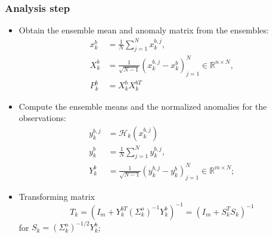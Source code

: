 \documentclass{article}
\begin{document}
\subsubsection{Analysis step}
\begin{itemize}
	\item Obtain the ensemble mean and anomaly matrix from the ensembles:
	      \begin{align*}
		      x_k^b & = \frac1N\sum_{j=1}^Nx_k^{b,j},                                           \\
		      X_k^b & = \frac1{\sqrt{N-1}}(x_k^{b,j} - x_k^b)_{j=1}^N\in\mathbb{R}^{n\times N}, \\
		      P_k^b & = X_k^bX_k^{bT}
	      \end{align*}
	\item Compute the ensemble means and the normalized anomalies for the observations:
	      \begin{align*}
		      y_k^{b,j} & = \mathcal{H}_k(x_k^{b,j})                                                \\
		      y_k^b     & = \frac1N\sum_{j=1}^Ny_k^{b,j},                                           \\
		      Y_k^b     & = \frac1{\sqrt{N-1}}(y_k^{b,j} - y_k^b)_{j=1}^N\in\mathbb{R}^{m\times N};
	      \end{align*}
	\item Transforming matrix
	      $$
		      T_k = (I_m+Y_k^{bT}(\Sigma_k^o)^{-1}Y_k^b)^{-1} = (I_m + S_k^TS_k)^{-1}
	      $$
	      for $S_k=(\Sigma_k^o)^{-1/2}Y_k^b$;


\end{itemize}
\end{document}
